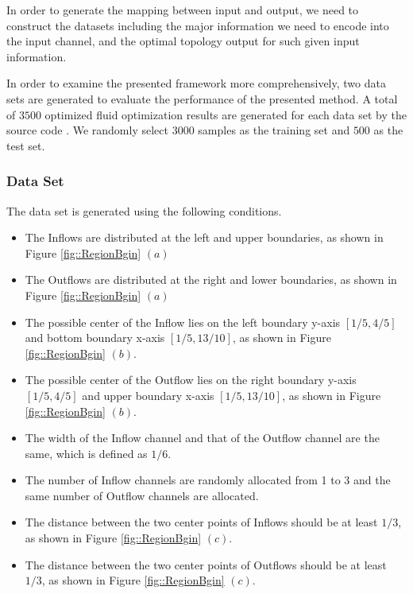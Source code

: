 \documentclass{article}
\begin{document}
In order to generate the mapping between input and output, we need to construct the datasets including the major information we need to encode into the input channel, and the optimal topology output for such given input information.

In order to examine the presented framework more comprehensively, two data sets are generated to evaluate the performance of the presented method. A total of $3500$ optimized fluid optimization results are generated for each data set by the source code \cite{5-borrvall2003topology, 5-1-guillaume2004topological, 5-2-aage2008topology}. We randomly select  $3000$ samples as the training set and $500$ as the test set.

\subsubsection{Data Set \uppercase\expandafter{}}
The data set \uppercase\expandafter{} is generated using the following conditions.
\begin{itemize}
\item The Inflows are distributed at the left and upper boundaries, as shown in Figure \ref{fig::RegionBgin} $(a)$
\item The Outflows are distributed at the right and lower boundaries, as shown in Figure \ref{fig::RegionBgin} $(a)$
\item The possible center of the Inflow lies on the left boundary y-axis $[1/5,4/5]$ and bottom boundary x-axis $[1/5,13/10]$, as shown in Figure \ref{fig::RegionBgin} $(b)$.
\item The possible center of the Outflow lies on the right boundary y-axis $[1/5,4/5]$ and upper boundary x-axis $[1/5,13/10]$, as shown in Figure \ref{fig::RegionBgin} $(b)$.
\item The width of the Inflow channel and that of the Outflow channel are the same, which is defined as $1/6$.
\item The number of Inflow channels are randomly allocated from 1 to 3 and the same number of Outflow channels are allocated.
\item The distance between the two center points of Inflows should be at least $1/3$, as shown in Figure \ref{fig::RegionBgin} $(c)$.
\item The distance between the two center points of Outflows should be at least $1/3$, as shown in Figure \ref{fig::RegionBgin} $(c)$.
\end{itemize}
\end{document}
